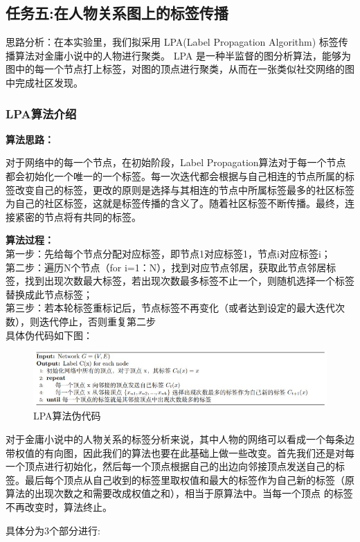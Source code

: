 \documentclass[a4paper,UTF8]{article}
\numberwithin{equation}{section}
\begin{document}
\subsection{任务五:在人物关系图上的标签传播}
思路分析：在本实验里，我们拟采用 LPA(Label Propagation Algorithm) 标签传播算法对金庸小说中的人物进行聚类。 LPA 是一种半监督的图分析算法，能够为图中的每一个节点打上标签，对图的顶点进行聚类，从而在一张类似社交网络的图中完成社区发现。
\subsubsection{LPA算法介绍}
\textbf{算法思路：}\par
对于网络中的每一个节点，在初始阶段，Label Propagation算法对于每一个节点都会初始化一个唯一的一个标签。每一次迭代都会根据与自己相连的节点所属的标签改变自己的标签，更改的原则是选择与其相连的节点中所属标签最多的社区标签为自己的社区标签，这就是标签传播的含义了。随着社区标签不断传播。最终，连接紧密的节点将有共同的标签。\par
\textbf{算法过程：}\\
第一步：先给每个节点分配对应标签，即节点1对应标签1，节点i对应标签i；\\
第二步：遍历N个节点（for i=1：N），找到对应节点邻居，获取此节点邻居标签，找到出现次数最大标签，若出现次数最多标签不止一个，则随机选择一个标签替换成此节点标签；\\
第三步：若本轮标签重标记后，节点标签不再变化（或者达到设定的最大迭代次数），则迭代停止，否则重复第二步\\
具体伪代码如下图：
\begin{figure}[H]
    \centering

    \includegraphics[width = 15cm]{LPAcode.jpg}

    \caption{LPA算法伪代码}
\end{figure}
对于金庸小说中的人物关系的标签分析来说，其中人物的网络可以看成一个每条边带权值的有向图，因此我们的算法也要在此基础上做一些改变。首先我们还是对每一个顶点进行初始化，然后每一个顶点根据自己的出边向邻接顶点发送自己的标签。最后每个顶点从自己收到的标签里取权值和最大的标签作为自己新的标签（原算法的出现次数之和需要改成权值之和），相当于原算法中。当每一个顶点 的标签不再改变时，算法终止。\par
具体分为3个部分进行: 
\end{document}
